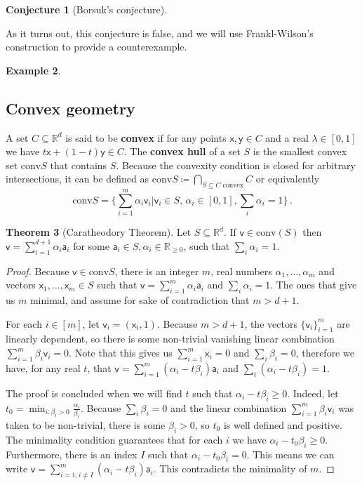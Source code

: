 \documentclass[12pt]{amsart}
\theoremstyle{definition}
\newtheorem{thm}{Theorem}[section]
\newtheorem{smpl}[thm]{Example}
\newtheorem{conj}[thm]{Conjecture}
\newcommand{\R}{\mathbb{R}}
\newcommand{\vv}{\mathsf{v}}
\newcommand{\vx}{\mathsf{x}}
\newcommand{\vy}{\mathsf{y}}
\newcommand{\va}{\mathsf{a}}
\newcommand{\conv}{\mathrm{conv}}
\begin{document}
\begin{conj}[Borsuk's conjecture]

\end{conj}

As it turns out, this conjecture is false, and we will use Frankl-Wilson's construction to provide a counterexample.


\begin{smpl}
\end{smpl}


\subsection{Convex geometry}

A set $C \subseteq \R^d$ is said to be \textbf{convex} if for any points $\vx, \vy \in C$ and a real $\lambda \in [0, 1]$ we have $t\vx + (1-t)\vy \in C$.
The \textbf{convex hull} of a set $S$ is the smallest convex set $\conv S $ that contains $S$.
Because the convexity condition is closed for arbitrary intersections, it can be defined as $\conv S \coloneqq \bigcap_{S \subseteq C \text{ convex}} C$ or equivalently
$$ \conv S = \{ \sum_{i=1}^m \alpha_i\vv_i | \vv_i \in S, \, \alpha_i \in [0, 1], \sum_i \alpha_i = 1\} \, . $$


\begin{thm}[Caratheodory Theorem]
Let $S \subseteq \R^d$.
If $\vv \in \conv (S)$ then $\vv = \sum_{i=1}^{d+1} \alpha_i \va_i$ for some $\va_i \in S, \alpha_i \in \R_{\geq 0}$, such that $\sum_i \alpha_i = 1$.
\end{thm}

\begin{proof}
Because $\vv \in \conv S$, there is an integer $m$, real numbers $\alpha_1, \ldots, \alpha_m $ and vectors $\vx_1, \ldots, \vx_m \in S $ such that $\vv = \sum_{i=1}^{m} \alpha_i \va_i$ and $\sum_i \alpha_i = 1$.
The ones that give us $m$ minimal, and assume for sake of contradiction that $m > d+1$.

For each $i \in [m]$, let $\vv_{i} = (\vx_i , 1)$.
Because $m > d+1$, the vectors $\{ \vv_i \}_{i=1}^m$ are linearly dependent, so there is some non-trivial vanishing linear combination $\sum_{i=1}^m \beta_i \vv_i = 0$.
Note that this gives us $\sum_{i=1}^m \vx_i = 0 $ and $\sum_i \beta_i = 0$, therefore we have, for any real $t$, that $\vv = \sum_{i=1}^{m} (\alpha_i - t \beta_i) \va_i$ and $\sum_i ( \alpha_i  - t \beta_i ) = 1$.

The proof is concluded when we will find $t$ such that $\alpha_i - t \beta_i \geq 0$.
Indeed, let $t_0 = \min_{i : \beta_i > 0} \frac{\alpha_i}{\beta_i}$.
Because $\sum_i \beta_i = 0$ and the linear combination $\sum_{i=1}^m \beta_i \vv_i$ was taken to be non-trivial, there is some $\beta_i > 0$, so $t_0 $ is well defined and positive.
The minimality condition guarantees that for each $i$ we have $\alpha_i - t_0 \beta_i \geq 0$.
Furthermore, there is an index $I$ such that $\alpha_i - t_0 \beta_i = 0$.
This means we can write $\vv = \sum_{i=1, i \neq I}^{m} (\alpha_i - t \beta_i) \va_i$.
This contradicts the minimality of $m$.
\end{proof}
\end{document}
